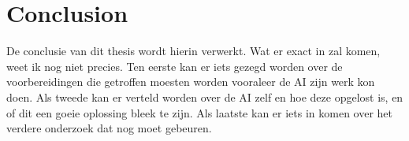 \documentclass[conference,a4paper]{IEEEtran}
\begin{document}
\section{Conclusion}
De conclusie van dit thesis wordt hierin verwerkt. Wat er exact in zal komen, weet ik nog niet precies. Ten eerste kan er iets gezegd worden over de voorbereidingen die getroffen moesten worden vooraleer de AI zijn werk kon doen. Als tweede kan er verteld worden over de AI zelf en hoe deze opgelost is, en of dit een goeie oplossing bleek te zijn. Als laatste kan er iets in komen over het verdere onderzoek dat nog moet gebeuren. 


%
%
%



\newpage


%




\end{document}

